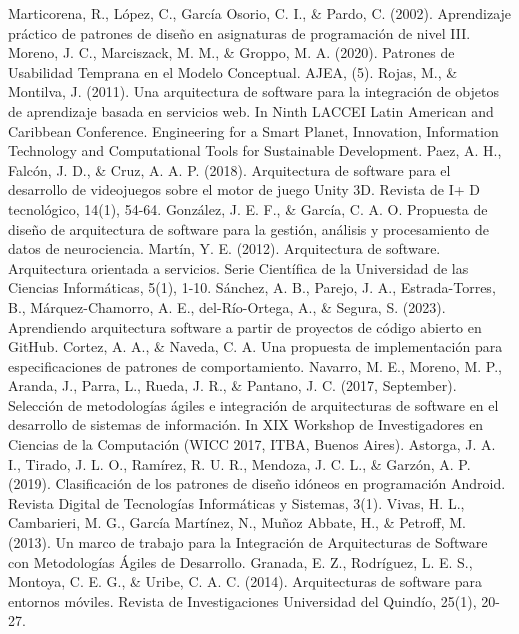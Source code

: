\documentclass[conference]{IEEEtran}
\begin{document}
\begin{thebibliography}{99}
 Marticorena, R., López, C., García Osorio, C. I., \& Pardo, C. (2002). Aprendizaje práctico de patrones de diseño en asignaturas de programación de nivel III.
 Moreno, J. C., Marciszack, M. M., \& Groppo, M. A. (2020). Patrones de Usabilidad Temprana en el Modelo Conceptual. AJEA, (5).
 Rojas, M., \& Montilva, J. (2011). Una arquitectura de software para la integración de objetos de aprendizaje basada en servicios web. In Ninth LACCEI Latin American and Caribbean Conference. Engineering for a Smart Planet, Innovation, Information Technology and Computational Tools for Sustainable Development.
 Paez, A. H., Falcón, J. D., \& Cruz, A. A. P. (2018). Arquitectura de software para el desarrollo de videojuegos sobre el motor de juego Unity 3D. Revista de I+ D tecnológico, 14(1), 54-64.
 González, J. E. F., \& García, C. A. O. Propuesta de diseño de arquitectura de software para la gestión, análisis y procesamiento de datos de neurociencia.
 Martín, Y. E. (2012). Arquitectura de software. Arquitectura orientada a servicios. Serie Científica de la Universidad de las Ciencias Informáticas, 5(1), 1-10.
 Sánchez, A. B., Parejo, J. A., Estrada-Torres, B., Márquez-Chamorro, A. E., del-Río-Ortega, A., \& Segura, S. (2023). Aprendiendo arquitectura software a partir de proyectos de código abierto en GitHub.
 Cortez, A. A., \& Naveda, C. A. Una propuesta de implementación para especificaciones de patrones de comportamiento.
 Navarro, M. E., Moreno, M. P., Aranda, J., Parra, L., Rueda, J. R., \& Pantano, J. C. (2017, September). Selección de metodologías ágiles e integración de arquitecturas de software en el desarrollo de sistemas de información. In XIX Workshop de Investigadores en Ciencias de la Computación (WICC 2017, ITBA, Buenos Aires).
 Astorga, J. A. I., Tirado, J. L. O., Ramírez, R. U. R., Mendoza, J. C. L., \& Garzón, A. P. (2019). Clasificación de los patrones de diseño idóneos en programación Android. Revista Digital de Tecnologías Informáticas y Sistemas, 3(1).
 Vivas, H. L., Cambarieri, M. G., García Martínez, N., Muñoz Abbate, H., \& Petroff, M. (2013). Un marco de trabajo para la Integración de Arquitecturas de Software con Metodologías Ágiles de Desarrollo.
 Granada, E. Z., Rodríguez, L. E. S., Montoya, C. E. G., \& Uribe, C. A. C. (2014). Arquitecturas de software para entornos móviles. Revista de Investigaciones Universidad del Quindío, 25(1), 20-27.

\end{thebibliography}
\end{document}
